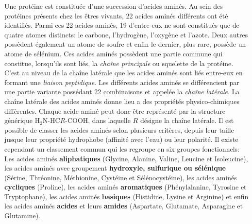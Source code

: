 Une protéine est constituée d'une succession d'acides aminés. Au sein des protéines présents chez les êtres vivants, 22 acides aminés différents ont été identifiés. Parmi ces 22 acides aminés, 19 d'entre-eux ne sont constitués que de quatre atomes distincts: le carbone, l'hydrogène, l'oxygène et l'azote. Deux autres possèdent également un atome de soufre et enfin le dernier, plus rare, possède un atome de sélénium. Ces acides aminés possèdent une partie commune qui constitue, lorsqu'ils sont liés, la \textit{chaîne principale} ou squelette de la protéine. C'est au niveau de la chaîne latérale que les acides aminés sont liés entre-eux en formant une \textit{liaison peptidique}. Les différents acides aminés se différencient par une partie variante possédant 22 combinaisons et appelée la \textit{chaîne latérale}. La chaîne latérale des acides aminés donne lieu a des propriétés physico-chimiques différentes. Chaque acide aminé peut donc être représenté par la structure générique H$_{2}$N-HC$R$-COOH, dans laquelle $R$ désigne la chaîne latérale. 
Il est possible de classer les acides aminés selon plusieurs critères, depuis leur taille jusque leur propriété hydrophobe (affinité avec l'eau) ou leur polarité. Il existe cependant un classement commun qui les regroupe en six groupes fonctionnels: Les acides aminés \textbf{aliphatiques} (Glycine, Alanine, Valine, Leucine et Isoleucine), les acides aminés avec groupement \textbf{hydroxyle, sulfurique ou sélénique} (Sérine, Thréonine, Méthionine, Cystéine et Sélénocystéine), les acides aminés \textbf{cycliques} (Proline), les acides aminés \textbf{aromatiques} (Phénylalanine, Tyrosine et Tryptophane), les acides aminés \textbf{basiques} (Histidine, Lysine et Arginine) et enfin les acides aminés \textbf{acides} et leurs \textbf{amides} (Aspartate, Glutamate, Asparagine et Glutamine).

